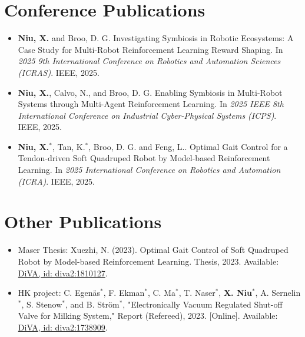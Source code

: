 \documentclass[a4paper,11pt]{article}
\newcommand{\resumeSubHeadingListStart}{\begin{itemize}[leftmargin=*,labelsep=0mm]}
\newcommand{\resumeSubHeadingListEnd}{\end{itemize}\vspace{2mm}}
\begin{document}
\section{\textbf{Conference Publications}}
\resumeSubHeadingListStart
\vspace{3mm}
  \item \hspace{0.3mm} \textbf{Niu, X.} and Broo, D. G. Investigating Symbiosis in Robotic Ecosystems: A Case Study for Multi-Robot Reinforcement Learning Reward Shaping. In \textit{2025 9th International Conference on Robotics and Automation Sciences (ICRAS)}. IEEE, 2025.
  \item \hspace{0.3mm} \textbf{Niu, X.}, Calvo, N., and Broo, D. G. Enabling Symbiosis in Multi-Robot Systems through Multi-Agent Reinforcement Learning. In \textit{2025 IEEE 8th International Conference on Industrial Cyber-Physical Systems (ICPS)}. IEEE, 2025.
  \item \hspace{0.3mm} \textbf{Niu, X.}$^*$, Tan, K.$^*$, Broo, D. G. and Feng, L.. Optimal Gait Control for a Tendon-driven Soft Quadruped Robot by Model-based Reinforcement Learning. In \textit{2025 International Conference on Robotics and Automation (ICRA)}. IEEE, 2025.
\resumeSubHeadingListEnd
\vspace{-5.5mm}

\section{\textbf{Other Publications}}
\resumeSubHeadingListStart
\vspace{3mm}
  \item \hspace{0.3mm} Maser Thesis: Xuezhi, N. (2023). Optimal Gait Control of Soft Quadruped Robot by Model-based Reinforcement Learning. Thesis, 2023. Available: \href{https://urn.kb.se/resolve?urn=urn:nbn:se:kth:diva-339056}{DiVA, id: diva2:1810127}.
  
  \item \hspace{0.3mm} HK project: C. Egenäs$^*$, F. Ekman$^*$, C. Ma$^*$, T. Naser$^*$, \textbf{X. Niu}$^*$, A. Sernelin$^*$, S. Stenow$^*$, and B. Ström$^*$, "Electronically Vacuum Regulated Shut-off Valve for Milking System," Report (Refereed), 2023. [Online]. Available: \href{https://urn.kb.se/resolve?urn=urn:nbn:se:kth:diva-324226}{DiVA, id: diva2:1738909}.
\resumeSubHeadingListEnd
\vspace{-5.5mm}
\end{document}
